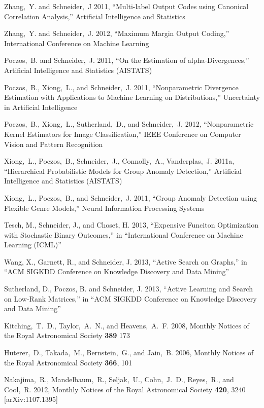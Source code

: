 \documentclass[prd,nofootbib,floatfix,11pt,tightenlines,nofootinbib]{revtex4}
\begin{document}
\begin{thebibliography}{99}
Zhang,~Y. and Schneider,~J 2011, ``Multi-label Output Codes using Canonical Correlation
Analysis,'' Artificial Intelligence and Statistics

Zhang,~Y. and Schneider,~J. 2012, ``Maximum Margin Output Coding,''
International Conference on Machine Learning

Poczos,~B. and Schneider,~J. 2011, ``On the Estimation of alpha-Divergences,''
Artificial Intelligence and Statistics (AISTATS)

Poczos,~B., Xiong,~L., and Schneider,~J. 2011, ``Nonparametric Divergence Estimation with
Applications to Machine Learning on Distributions,''  Uncertainty in Artificial
Intelligence

Poczos,~B., Xiong,~L., Sutherland,~D., and Schneider,~J. 2012,
``Nonparametric Kernel Estimators for Image Classification,''
IEEE Conference on Computer Vision and Pattern Recognition

Xiong,~L., Poczos,~B., Schneider,~J., Connolly,~A., Vanderplas,~J. 2011a,
``Hierarchical Probabilistic Models for Group Anomaly Detection,''
Artificial Intelligence and Statistics (AISTATS)

Xiong,~L., Poczos,~B., and Schneider,~J. 2011, ``Group Anomaly Detection using Flexible
Genre Models,'' Neural Information Processing Systems

Tesch, M., Schneider, J., and Choset, H. 2013,
``Expensive Funciton Optimization with Stochastic Binary Outcomes,''
in ``International Conference on Machine Learning (ICML)''

Wang, X., Garnett, R., and Schneider, J. 2013,
``Active Search on Graphs,'' in ``ACM SIGKDD Conference on Knowledge Discovery
and Data Mining''

Sutherland, D., Poczos, B. and Schneider, J. 2013,
``Active Learning and Search on Low-Rank Matrices,'' in
``ACM SIGKDD Conference on Knowledge Discovery and Data Mining''

Kitching,~T.~D., Taylor,~A.~N., and Heavens,~A.~F. 2008,
Monthly Notices of the Royal Astronomical Society {\bf 389} 173

Huterer,~D., Takada,~M., Bernstein,~G., and Jain,~B. 2006,
Monthly Notices of the Royal Astronomical Society {\bf 366}, 101

Nakajima,~R., Mandelbaum,~R., Seljak,~U., Cohn,~J.~D., Reyes,~R., and
Cool,~R. 2012, Monthly Notices of the Royal Astronomical Society {\bf 420}, 3240
[arXiv:1107.1395]


\end{thebibliography}
\end{document}
